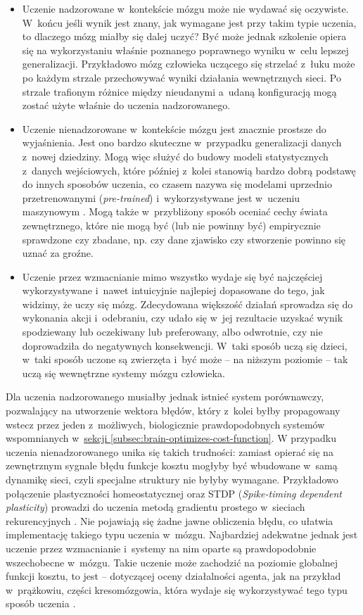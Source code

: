\begin{itemize}
	\item Uczenie nadzorowane w~kontekście mózgu może nie wydawać się oczywiste.
	      W~końcu jeśli wynik jest znany, jak wymagane jest przy takim typie uczenia, to dlaczego mózg miałby się dalej uczyć?
	      Być może jednak szkolenie opiera się na wykorzystaniu właśnie poznanego poprawnego wyniku w~celu lepszej generalizacji.
	      Przykładowo mózg człowieka uczącego się strzelać z~łuku może po każdym strzale przechowywać wyniki działania wewnętrznych sieci.
	      Po strzale trafionym różnice między nieudanymi a~udaną konfiguracją mogą zostać użyte właśnie do uczenia nadzorowanego.
	\item Uczenie nienadzorowane w~kontekście mózgu jest znacznie prostsze do wyjaśnienia.
	      Jest ono bardzo skuteczne w~przypadku generalizacji danych z~nowej dziedziny.
	      Mogą więc służyć do budowy modeli statystycznych z~danych wejściowych, które później z~kolei stanowią bardzo dobrą podstawę do innych sposobów uczenia, co czasem nazywa się modelami uprzednio przetrenowanymi (\emph{pre-trained}) i~wykorzystywane jest w~uczeniu maszynowym \cite{erhan2009difficulty}.
	      Mogą także w~przybliżony sposób oceniać cechy świata zewnętrznego, które nie mogą być (lub nie powinny być) empirycznie sprawdzone czy zbadane, np. czy dane zjawisko czy stworzenie powinno się uznać za groźne.
	\item Uczenie przez wzmacnianie mimo wszystko wydaje się być najczęściej wykorzystywane i~nawet intuicyjnie najlepiej dopasowane do tego, jak widzimy, że uczy się mózg.
	      Zdecydowana większość działań sprowadza się do wykonania akcji i~odebraniu, czy udało się w~jej rezultacie uzyskać wynik spodziewany lub oczekiwany lub preferowany, albo odwrotnie, czy nie doprowadziła do negatywnych konsekwencji.
	      W~taki sposób uczą się dzieci, w~taki sposób uczone są zwierzęta i~być może -- na niższym poziomie -- tak uczą się wewnętrzne systemy mózgu człowieka.
\end{itemize}

Dla uczenia nadzorowanego musiałby jednak istnieć system porównawczy, pozwalający na utworzenie wektora błędów, który z~kolei byłby propagowany wstecz przez jeden z~możliwych, biologicznie prawdopodobnych systemów wspomnianych w~\hyperref[subsec:brain-optimizes-cost-function]{sekcji \ref*{subsec:brain-optimizes-cost-function}}.
W przypadku uczenia nienadzorowanego unika się takich trudności: zamiast opierać się na zewnętrznym sygnale błędu funkcje kosztu mogłyby być wbudowane w~samą dynamikę sieci, czyli specjalne struktury nie byłyby wymagane.
Przykładowo połączenie plastyczności homeostatycznej oraz STDP (\emph{Spike-timing dependent plasticity}) prowadzi do uczenia metodą gradientu prostego w~sieciach rekurencyjnych \cite{galtier2013biological}.
Nie pojawiają się żadne jawne obliczenia błędu, co ułatwia implementację takiego typu uczenia w~mózgu.
Najbardziej adekwatne jednak jest uczenie przez wzmacnianie i~systemy na nim oparte są prawdopodobnie wszechobecne w~mózgu.
Takie uczenie może zachodzić na poziomie globalnej funkcji kosztu, to jest -- dotyczącej oceny działalności agenta, jak na przykład w~prążkowiu, części kresomózgowia, która wydaje się wykorzystywać tego typu sposób uczenia \cite{o2014goal}.


